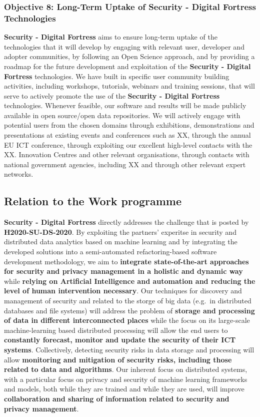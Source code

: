 \documentclass[a4paper,11pt]{article}
\newcommand{\project}[1]{\textbf{#1}\xspace}
\newcommand{\SECURITY}{\project{Security - Digital Fortress}}
\newcommand{\TheProject}{\SECURITY}
\begin{document}
\subsubsection*{Objective 8: Long-Term Uptake of \TheProject{} Technologies} 
\vspace{-7pt}
\TheProject{} aims to ensure long-term uptake of the technologies that it will develop by engaging with relevant user, developer and adopter communities, by following an Open Science approach, and by providing a roadmap for the future development and exploitation of the \TheProject{} technologies. We have built in specific user community building activities, including workshops, tutorials, webinars and training sessions, that will serve to actively promote the use of the \TheProject{} technologies. Whenever feasible, our software and results will be made publicly available in open source/open data repositories. We will actively engage with potential users from the chosen domains through exhibitions, demonstrations and presentations at existing events and conferences such as XX, through the annual EU ICT conference, through exploiting our excellent high-level contacts with the XX. Innovation Centres and other relevant organisations, through contacts with national government agencies, including XX and through other relevant expert networks.

\pagebreak
\subsection{Relation to the Work programme}

\TheProject{} directly addresses the challenge that is posted by \textbf{H2020-SU-DS-2020}. By exploiting the partners' experitse in security and distributed data analytics based on machine learning and by integrating the developed solutions into a semi-automated refactoring-based software development methodology, we aim to \textbf{integrate state-of-the-art approaches for security and privacy management in a holistic and dynamic way} while \textbf{relying on Artificial Intelligence and automation and reducing the level of human intervention necessary}. Our techniques for discovery and management of security and related to the storge of big data (e.g.~in distributed databases and file systems) will address the problem of \textbf{storage and processing of data in different interconnected places} while the focus on its large-scale machine-learning based distributed processing will allow the end users to \textbf{constantly forecast, monitor and update the security of their ICT systems}. Collectively, detecting security risks in data storage and processing will allow \textbf{monitoring and mitigation of security risks, including those related to data and algorithms}. Our inherent focus on distributed systems, with a particular focus on privacy and security of machine learning frameworks and models, both while they are trained and while they are used, will improve \textbf{collaboration and sharing of information related to security and privacy management}. 
\end{document}
